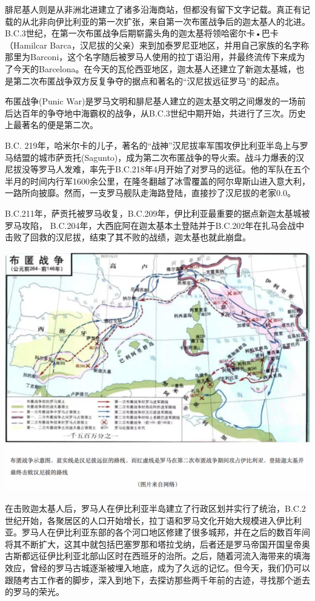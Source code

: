 \documentclass[]{book}
\begin{document}
腓尼基人则是从非洲北进建立了诸多沿海商站，但都没有留下文字记载。真正有记载的从北非向伊比利亚的第一次扩张，来自第一次布匿战争后的迦太基人的北进。B.C.3世纪，在第一次布匿战争后期崭露头角的迦太基将领哈密尔卡•巴卡（Hamilcar
Barca，汉尼拔的父亲）来到加泰罗尼亚地区，并用自己家族的名字称那里为Barconi，这个名字随后被罗马人使用的拉丁语沿用，并最终流传下来成为了今天的Barcelona。在今天的瓦伦西亚地区，迦太基人还建立了新迦太基城，也是第二次布匿战争双方反复争夺的据点和著名的``汉尼拔远征罗马''的起点。

布匿战争(Punic
War)是罗马文明和腓尼基人建立的迦太基文明之间爆发的一场前后达百年的争夺地中海霸权的战争，从B.C.3世纪中期开始，共进行了三次。历史上最著名的便是第二次。

B.C.
219年，哈米尔卡的儿子，著名的``战神''汉尼拔率军围攻伊比利亚半岛上与罗马结盟的城市萨贡托(Sagunto)，成为第二次布匿战争的导火索。战斗力爆表的汉尼拔没等罗马人发难，率先于B.C.218年4月开始了对罗马的远征。他的军队在五个半月的时间内行军1600余公里，在隆冬翻越了冰雪覆盖的阿尔卑斯山进入意大利，一路所向披靡。然而，一支罗马舰队走海路登陆，直接抄了汉尼拔的老家0.0。

B.C.211年，萨贡托被罗马收复，B.C.209年，伊比利亚最重要的据点新迦太基城被罗马攻陷，
B.C.204年，大西庇阿在迦太基本土登陆并于B.C.202年在扎马会战中击败了回救的汉尼拔，结束了其不败的战绩，迦太基也就此崩盘。

\includegraphics[width=8.33in]{images/xt12}

在击败迦太基人后，罗马人在伊比利亚半岛建立了行政区划并实行了统治，B.C.2世纪开始，各聚居区的人口开始增长，拉丁语和罗马文化开始大规模进入伊比利亚。罗马人在伊比利亚东部的各个河口地区修建了很多城邦，并在之后的数百年间将其不断扩大，这其中就包括巴塞罗那和塔拉戈纳，后者还是罗马帝国开国皇帝奥古斯都远征伊比利亚北部山区时在西班牙的治所。之后，随着河流入海带来的填海效应，曾经的罗马古城逐渐被埋入地底，成为了久远的记忆。但今天，我们仍可以跟随考古工作者的脚步，深入到地下，去探访那些两千年前的古迹，寻找那个逝去的罗马的荣光。
\end{document}
